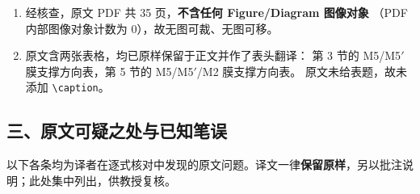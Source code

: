 \begin{enumerate}[label=（\arabic*）,leftmargin=*]
  \item 经核查，原文 PDF 共 35 页，\textbf{不含任何 Figure/Diagram 图像对象}
        （PDF 内部图像对象计数为 0），故无图可裁、无图可移。
  \item 原文含两张表格，均已原样保留于正文并作了表头翻译：
        第 3 节的 M5/M5$'$ 膜支撑方向表，第 5 节的 M5/M5$'$/M2 膜支撑方向表。
        原文未给表题，故未添加 \verb|\caption|。
\end{enumerate}

\subsection*{三、原文可疑之处与已知笔误}

以下各条均为译者在逐式核对中发现的原文问题。译文一律\textbf{保留原样}，另以批注说明；此处集中列出，供教授复核。

